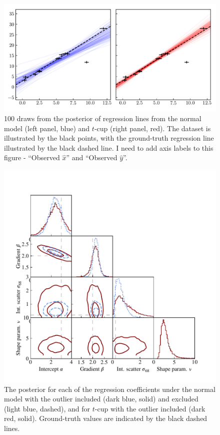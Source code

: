 \documentclass[fleqn,usenatbib]{mnras}
\begin{document}
\begin{figure}
    \includegraphics[width=\linewidth]{graphics/regression_outlier.pdf}
    \caption{{\color{red} 100} draws from the posterior of regression lines from
    the normal model (left panel, blue) and $t$-cup (right panel, red). The
    dataset is illustrated by the black points, with the ground-truth regression
    line illustrated by the black dashed line. {\color{red} I need to add axis
    labels to this figure - ``Observed $\hat{x}$'' and ``Observed $\hat{y}$''.}}
    \label{fig:results.outlier.regression}
\end{figure}

\begin{figure}
    \includegraphics[width=\columnwidth]{graphics/corner_outlier_ncup.pdf}
    \caption{The posterior for each of the regression coefficients under the
    normal model with the outlier included (dark blue, solid) and excluded
    (light blue, dashed), and for $t$-cup with the outlier included (dark red,
    solid). Ground-truth values are indicated by the black dashed lines.}
    \label{fig:results.outlier.corner}
\end{figure}
\end{document}
